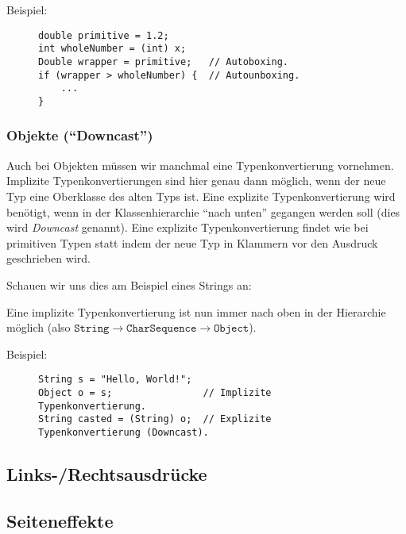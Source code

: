 			Beispiel:
			\begin{figure}[H]
				\centering
				\begin{lstlisting}
double primitive = 1.2;
int wholeNumber = (int) x;
Double wrapper = primitive;   // Autoboxing.
if (wrapper > wholeNumber) {  // Autounboxing.
	...
}
\end{lstlisting}
			\end{figure}
		
	
	\subsubsection{Objekte (\enquote{Downcast})}
		Auch bei Objekten müssen wir manchmal eine Typenkonvertierung vornehmen. Implizite Typenkonvertierungen sind hier genau dann möglich, wenn der neue Typ eine Oberklasse des alten Typs ist. Eine explizite Typenkonvertierung wird benötigt, wenn in der Klassenhierarchie \enquote{nach unten} gegangen werden soll (dies wird \textit{Downcast} genannt). Eine explizite Typenkonvertierung findet wie bei primitiven Typen statt indem der neue Typ in Klammern vor den Ausdruck geschrieben wird.
		
		Schauen wir uns dies am Beispiel eines Strings an:
		\begin{figure}[H]
			\centering
		\end{figure}
		Eine implizite Typenkonvertierung ist nun immer nach oben in der Hierarchie möglich (also \( \texttt{String} \rightarrow \texttt{CharSequence} \rightarrow \texttt{Object} \)).
		
		Beispiel:
		\begin{figure}[H]
			\centering
			\begin{lstlisting}
String s = "Hello, World!";
Object o = s;                // Implizite Typenkonvertierung.
String casted = (String) o;  // Explizite Typenkonvertierung (Downcast).
\end{lstlisting}
		\end{figure}

\subsection{Links-/Rechtsausdrücke}

\subsection{Seiteneffekte}
